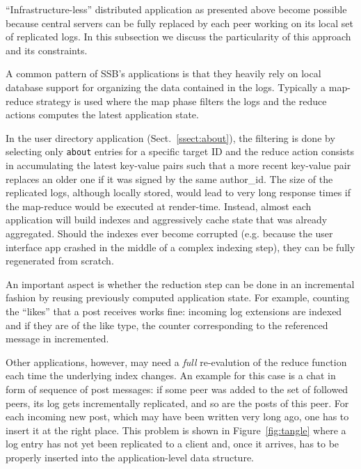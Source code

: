 \documentclass[10pt,sigconf,rewiew]{acmart}
\begin{document}
``Infrastructure-less'' distributed application as presented above
become possible because central servers can be fully replaced by each
peer working on its local set of replicated logs. In this subsection
we discuss the particularity of this approach and its constraints.

A common pattern of SSB's applications is that they heavily rely
on local database support for organizing the data contained in the logs.
Typically a map-reduce strategy is used where the map phase filters
the logs and the reduce actions computes the latest application state.

In the user directory application (Sect.~\ref{ssect:about}), the filtering is
done by selecting only {\tt about} entries for a specific target ID
and the reduce action consists in accumulating the latest key-value
pairs such that a more recent key-value pair replaces an older one if
it was signed by the same author\_id. The size of the replicated logs,
although locally stored, would lead to very long response times if the
map-reduce would be executed at render-time. Instead, almost each
application will build indexes and aggressively cache state that was
already aggregated. Should the indexes ever become corrupted
(e.g. because the user interface app crashed in the middle of a
complex indexing step), they can be fully regenerated from scratch.

An important aspect is whether the reduction step can be done in an
incremental fashion by reusing previously computed application state.
For example, counting the ``likes'' that a post receives works fine:
incoming log extensions are indexed and if they are of the like type,
the counter corresponding to the referenced message in incremented.

Other applications, however, may need a {\em full} re-evalution of the
reduce function each time the underlying index changes. An example for
this case is a chat in form of sequence of post messages: if some peer was added to
the set of followed peers, its log gets incrementally replicated, and
so are the posts of this peer. For each incoming new post, which may
have been written very long ago, one has to insert it at the right
place. This problem is shown in Figure~\ref{fig:tangle} where a log
entry has not yet been replicated to a client and, once it arrives,
has to be properly inserted into the application-level data structure.
\end{document}
